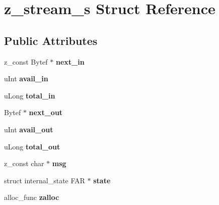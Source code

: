 \hypertarget{structz__stream__s}{}\section{z\+\_\+stream\+\_\+s Struct Reference}
\label{structz__stream__s}
\subsection*{Public Attributes}
\begin{DoxyCompactItemize}
\item 
\mbox{\label{structz__stream__s_a71613678076af3a9a4bb28d51a146150}} 
z\+\_\+const Bytef $\ast$ {\bfseries next\+\_\+in}
\item 
\mbox{\label{structz__stream__s_a0cf177f50dbb49692f27480cbcfde794}} 
u\+Int {\bfseries avail\+\_\+in}
\item 
\mbox{\label{structz__stream__s_aa8f408b9632737dc21519fa1ed34b08d}} 
u\+Long {\bfseries total\+\_\+in}
\item 
\mbox{\label{structz__stream__s_aed4a02cfe93e975314fed50b04427bf3}} 
Bytef $\ast$ {\bfseries next\+\_\+out}
\item 
\mbox{\label{structz__stream__s_a45ad2364307af9d944fd39d4eca3ca3c}} 
u\+Int {\bfseries avail\+\_\+out}
\item 
\mbox{\label{structz__stream__s_abae26f1f236cf920250b9d37fdf009c1}} 
u\+Long {\bfseries total\+\_\+out}
\item 
\mbox{\label{structz__stream__s_af116e1f45cb4399c0568b23b3e8b8c16}} 
z\+\_\+const char $\ast$ {\bfseries msg}
\item 
\mbox{\label{structz__stream__s_ac4a114217a1868dc6fbe7d1f5bda126b}} 
struct internal\+\_\+state F\+AR $\ast$ {\bfseries state}
\item 
\mbox{\label{structz__stream__s_a23a2299c384f808e76e9908f21216b0f}} 
alloc\+\_\+func {\bfseries zalloc}
\item 

\end{DoxyCompactItemize}
